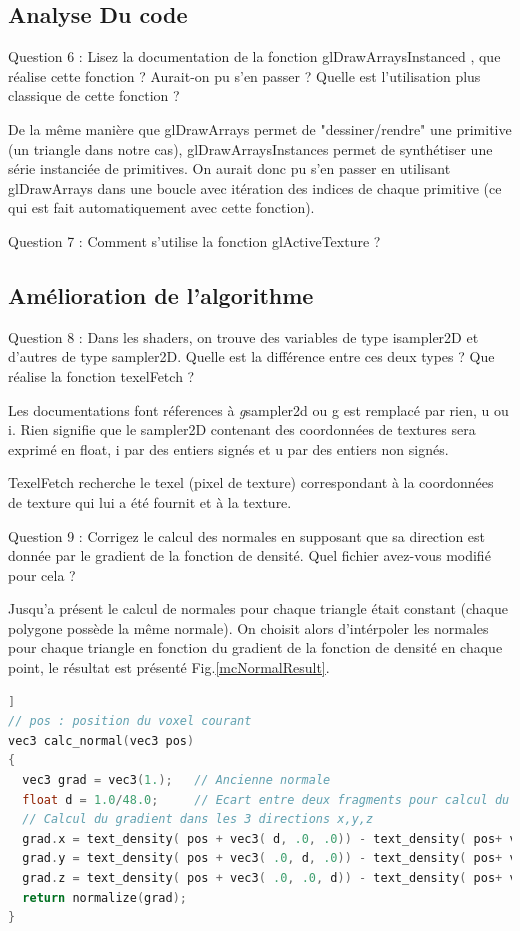 \documentclass[a4paper]{article}
\begin{document}
\subsection{Analyse Du code}
Question 6 : Lisez la documentation de la fonction glDrawArraysInstanced , que réalise cette fonction ? Aurait-on pu s’en
passer ? Quelle est l’utilisation plus classique de cette fonction ?

De la même manière que glDrawArrays permet de "dessiner/rendre" une primitive (un triangle dans notre cas), glDrawArraysInstances permet de synthétiser une série instanciée de primitives. On aurait donc pu s'en passer en utilisant glDrawArrays dans une boucle avec itération des indices de chaque primitive (ce qui est fait automatiquement avec cette fonction). 

Question 7 : Comment s’utilise la fonction glActiveTexture ? 


\subsection{Amélioration de l'algorithme}

Question 8 : Dans les shaders, on trouve des variables de type isampler2D et d’autres de type sampler2D. Quelle est la
différence entre ces deux types ?  Que réalise la fonction texelFetch ?

Les documentations font réferences à \textit{g}sampler2d ou g est remplacé par rien, u ou i. Rien signifie que le sampler2D contenant des coordonnées de textures sera exprimé en float, i par des entiers signés et u par des entiers non signés. 

TexelFetch recherche le texel (pixel de texture) correspondant à la coordonnées de texture qui lui a été fournit et à la texture. 

Question 9 : Corrigez le calcul des normales en supposant que sa direction est donnée par le gradient de la fonction de
densité. Quel fichier avez-vous modifié pour cela ?

Jusqu'a présent le calcul de normales pour chaque triangle était constant (chaque polygone possède la même normale). On choisit alors d'intérpoler  les normales pour chaque triangle en fonction du gradient de la fonction de densité en chaque point, le résultat est présenté Fig.\ref{mcNormalResult}. 

\begin{lstlisting}[language=C++,
                   directivestyle={\color{black}}
                   emph={int,char,double,float,unsigned},
                   emphstyle={\color{blue}}
                  ]]
// pos : position du voxel courant
vec3 calc_normal(vec3 pos)
{
  vec3 grad = vec3(1.);   // Ancienne normale 
  float d = 1.0/48.0;     // Ecart entre deux fragments pour calcul du gradient
  // Calcul du gradient dans les 3 directions x,y,z
  grad.x = text_density( pos + vec3( d, .0, .0)) - text_density( pos+ vec3(-d, .0, .0));
  grad.y = text_density( pos + vec3( .0, d, .0)) - text_density( pos+ vec3( .0,-d, .0));
  grad.z = text_density( pos + vec3( .0, .0, d)) - text_density( pos+ vec3( .0, .0,-d));
  return normalize(grad);
}
\end{lstlisting}
\end{document}
